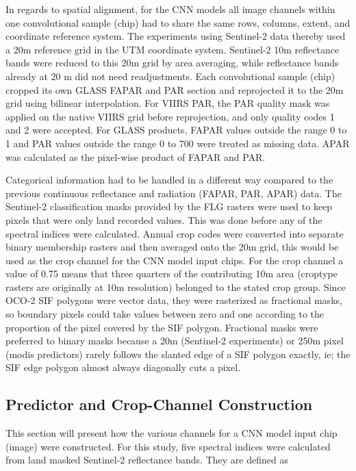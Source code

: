 In regards to spatial alignment, for the CNN models all image channels within one convolutional sample (chip) had to share the same rows, columns, extent, and coordinate reference system. The experiments using Sentinel-2 data thereby used a 20m reference grid in the UTM coordinate system. Sentinel-2 10m reflectance bands were reduced to this 20m grid by area averaging, while reflectance bands already at 20 m did not need readjustments. Each convolutional sample (chip) cropped its own GLASS FAPAR and PAR section and reprojected it to the 20m grid using bilinear interpolation. For VIIRS PAR, the PAR quality mask was applied on the native VIIRS grid before reprojection, and only quality codes 1 and 2 were accepted. For GLASS products, FAPAR values outside the range 0 to 1 and PAR values outside the range 0 to 700 were treated as missing data. APAR was calculated as the pixel-wise product of FAPAR and PAR. 

Categorical information had to be handled in a different way compared to the previous continuous reflectance and radiation (FAPAR, PAR, APAR) data. The Sentinel-2 classification masks provided by the FLG rasters were used to keep pixels that were only land recorded values. This was done before any of the spectral indices were calculated. Annual crop codes were converted into separate binary membership rasters and then averaged onto the 20m grid, this would be used as the crop channel for the CNN model input chips. For the crop channel a value of 0.75 means that three quarters of the contributing 10m area (croptype rasters are originally at 10m resolution) belonged to the stated crop group. Since OCO-2 SIF polygons were vector data, they were rasterized as fractional masks, so boundary pixels could take values between zero and one according to the proportion of the pixel covered by the SIF polygon. Fractional masks were preferred to binary masks because a 20m (Sentinel-2 experiments) or 250m pixel (modis predictors) rarely follows the slanted edge of a SIF polygon exactly, ie; the SIF edge polygon almost always diagonally cuts a pixel. 

\subsection{Predictor and Crop-Channel Construction}

This section will present how the various channels for a CNN model input chip (image)  were constructed. For this study, five spectral indices were calculated from land masked Sentinel-2 reflectance bands. They are defined as 

